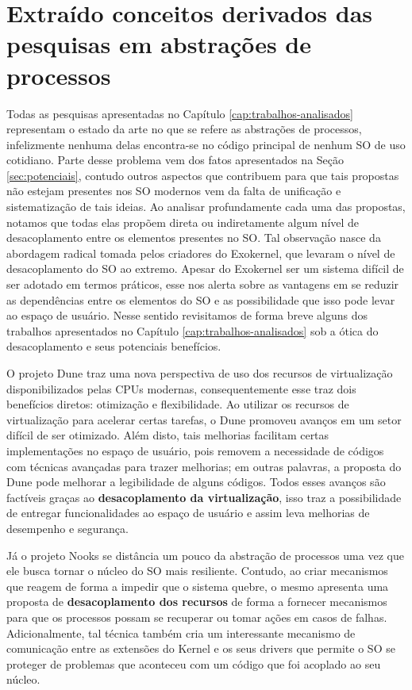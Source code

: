 \section{Extraído conceitos derivados das pesquisas em abstrações de processos}

Todas as pesquisas apresentadas no Capítulo \ref{cap:trabalhos-analisados}
representam o estado da arte no que se refere as abstrações de processos,
infelizmente nenhuma delas encontra-se no código principal de nenhum SO de uso
cotidiano. Parte desse problema vem dos fatos apresentados na Seção
\ref{sec:potenciais}, contudo outros aspectos que contribuem para que tais
propostas não estejam presentes nos SO modernos vem da falta de unificação e
sistematização de tais ideias. Ao analisar profundamente cada uma das
propostas, notamos que todas elas propõem direta ou indiretamente algum nível
de desacoplamento entre os elementos presentes no SO. Tal observação nasce da
abordagem radical tomada pelos criadores do Exokernel, que levaram o nível de
desacoplamento do SO ao extremo. Apesar do Exokernel ser um sistema difícil de
ser adotado em termos práticos, esse nos alerta sobre as vantagens em se
reduzir as dependências entre os elementos do SO e as possibilidade que isso
pode levar ao espaço de usuário. Nesse sentido revisitamos de forma breve
alguns dos trabalhos apresentados no Capítulo \ref{cap:trabalhos-analisados}
sob a ótica do desacoplamento e seus potenciais benefícios.

O projeto Dune traz uma nova perspectiva de uso dos recursos de virtualização
disponibilizados pelas CPUs modernas, consequentemente esse traz dois
benefícios diretos: otimização e flexibilidade. Ao utilizar os recursos de
virtualização para acelerar certas tarefas, o Dune promoveu avanços em um setor
difícil de ser otimizado. Além disto, tais melhorias facilitam certas
implementações no espaço de usuário, pois removem a necessidade de códigos com
técnicas avançadas para trazer melhorias; em outras palavras, a proposta do
Dune pode melhorar a legibilidade de alguns códigos. Todos esses avanços são
factíveis graças ao \textbf{desacoplamento da virtualização}, isso traz a
possibilidade de entregar funcionalidades ao espaço de usuário e assim leva
melhorias  de desempenho e segurança.

Já o projeto Nooks se distância um pouco da abstração de processos uma vez que
ele busca tornar o núcleo do SO mais resiliente. Contudo, ao criar mecanismos
que reagem de forma a impedir que o sistema quebre, o mesmo apresenta uma
proposta de \textbf{desacoplamento dos recursos} de forma a fornecer mecanismos
para que os processos possam se recuperar ou tomar ações em casos de falhas.
Adicionalmente, tal técnica também cria um interessante mecanismo de
comunicação entre as extensões do Kernel e os seus drivers que permite o SO se
proteger de problemas que aconteceu com um código que foi acoplado ao seu
núcleo.

